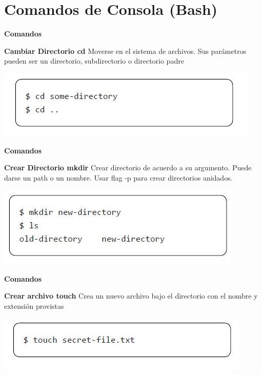 \documentclass{beamer}
\begin{document}
\section{Comandos de Consola (Bash)}


\begin{frame}
	
	\textbf{Comandos}
	\begin{block}{\textbf{Cambiar Directorio cd}}
		Moverse en el sistema de archivos. 
		Sus parámetros pueden ser un directorio, subdirectorio o directorio padre\\
	\end{block}	
	\begin{center}
		\includegraphics[scale=.6]{img/bash/cd.JPG}
	\end{center}
	
\end{frame}

\begin{frame}
	
	\textbf{Comandos}
	\begin{block}{\textbf{Crear Directorio mkdir}}
		Crear directorio de acuerdo a su argumento. Puede darse un path o un nombre. Usar flag -p para crear directorios anidados.
	\end{block}	
	\begin{center}
		\includegraphics[scale=.6]{img/bash/mkdir.JPG}
	\end{center}
	
\end{frame}

\begin{frame}

	\textbf{Comandos}
	\begin{block}{\textbf{Crear archivo touch}}
		Crea un nuevo archivo bajo el directorio con el nombre y extensión provistas
	\end{block}	
	\begin{center}
		\includegraphics[scale=.6]{img/bash/touch.JPG}
	\end{center}

\end{frame}
\end{document}
